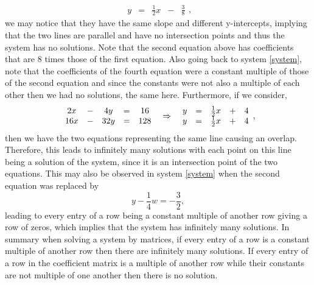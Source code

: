 \documentclass{ximera}
\begin{document}
\begin{example}
\begin{explanation}
\[\begin{array}{ccccc}
     y &=& \frac{1}{2}x&-& \frac{3}{8}
\end{array},
\]
we may notice that they have the same slope and different y-intercepts, implying that the two lines are parallel and have no intersection points and thus the system has no solutions. Note that the second equation above has coefficients that are $8$ times those of the first equation. Also going back to system \eqref{system}, note that the coefficients of the fourth equation were a constant multiple of those of the second equation and since the constants were not also a multiple of each other then we had no solutions, the same here. Furthermore, if we consider,
\[
\begin{array}{ccccc}
     2x& -&4y&=&16\\
     16x &-& 32y&=& 128
\end{array}
\hspace{.2cm}\Rightarrow \hspace{.2cm}
\begin{array}{ccccc}
     y&=&\frac{1}{2}x&+&4\\
     y &=& \frac{1}{2}x&+& 4
\end{array},
\]
then we have the two equations representing the same line causing an overlap. Therefore, this leads to infinitely many solutions with each point on this line being a solution of the system, since it is an intersection point of the two equations. This may also be observed in system \eqref{system} when the second equation was replaced by
\begin{equation*}
y-\frac{1}{4}w= -\frac{3}{2},
\end{equation*}
leading to every entry of a row being a constant multiple of another row giving a row of zeros, which implies that the system has infinitely many solutions. In summary when solving a system by matrices, if every entry of a row is a constant multiple of another row then there are infinitely many solutions. If every entry of a row in the coefficient matrix is a multiple of another row while their constants are not multiple of one another then there is no solution.
\end{explanation}

\end{example}
\end{document}
